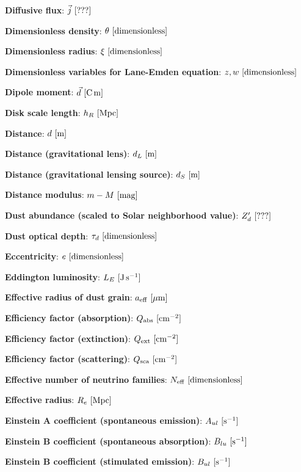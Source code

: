 \documentclass[a4paper,10pt]{article}
\begin{document}
{\noindent}\textbf{Diffusive flux}: $\vec{j} ~ [{\rm ???}]$

{\noindent}\textbf{Dimensionless density}: $\theta ~ [{\rm dimensionless}]$

{\noindent}\textbf{Dimensionless radius}: $\xi ~ [{\rm dimensionless}]$

{\noindent}\textbf{Dimensionless variables for Lane-Emden equation}: $z, w ~ [{\rm dimensionless}]$

{\noindent}\textbf{Dipole moment}: $\vec{d} ~ [{\rm C\,m}]$

{\noindent}\textbf{Disk scale length}: $h_R ~ [{\rm Mpc}]$

{\noindent}\textbf{Distance}: $d ~ [{\rm m}]$

{\noindent}\textbf{Distance (gravitational lens)}: $d_L ~ [{\rm m}]$

{\noindent}\textbf{Distance (gravitational lensing source)}: $d_S ~ [{\rm m}]$

{\noindent}\textbf{Distance modulus}: $m - M ~ [{\rm mag}]$

{\noindent}\textbf{Dust abundance (scaled to Solar neighborhood value)}: $Z_d' ~ [{\rm ???}]$

{\noindent}\textbf{Dust optical depth}: $\tau_d ~ [{\rm dimensionless}]$

{\noindent}\textbf{Eccentricity}: $e ~ [{\rm dimensionless}]$

{\noindent}\textbf{Eddington luminosity}: $L_E ~ [{\rm J\,s^{-1}}]$

{\noindent}\textbf{Effective radius of dust grain}: $a_{\rm eff} ~ [{\rm \mu m}]$

{\noindent}\textbf{Efficiency factor (absorption)}: $Q_{\rm abs} ~ [{\rm cm^{-2}}]$

{\noindent}\textbf{Efficiency factor (extinction)}: $Q_{\rm ext} ~ [{\rm cm^{-2}}]$

{\noindent}\textbf{Efficiency factor (scattering)}: $Q_{\rm sca} ~ [{\rm cm^{-2}}]$

{\noindent}\textbf{Effective number of neutrino families}: $N_\mathrm{eff} ~ [{\rm dimensionless}]$

{\noindent}\textbf{Effective radius}: $R_e ~ [{\rm Mpc}]$

{\noindent}\textbf{Einstein A coefficient (spontaneous emission)}: $A_{ul} ~ [{\rm s^{-1}}]$

{\noindent}\textbf{Einstein B coefficient (spontaneous absorption)}: $B_{lu} ~ [{\rm s^{-1}}]$

{\noindent}\textbf{Einstein B coefficient (stimulated emission)}: $B_{ul} ~ [{\rm s^{-1}}]$
\end{document}

